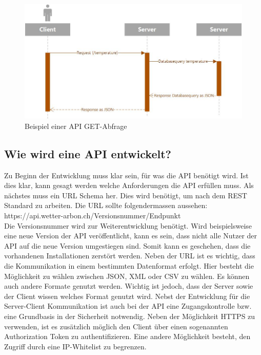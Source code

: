 \begin{figure}[h!]
	\centering
	\includegraphics[width=1\linewidth]{img/Sequenzdiagramm_API}
	\caption{Beispiel einer API GET-Abfrage}
	\label{img:Sequenzdiagramm_API}
\end{figure}


\subsection{Wie wird eine API entwickelt?}
Zu Beginn der Entwicklung muss klar sein, für was die API benötigt wird. Ist dies klar, kann gesagt werden welche Anforderungen die API erfüllen muss. Als nächstes muss ein URL Schema her. Dies wird benötigt, um nach dem REST Standard zu arbeiten. Die URL sollte folgendermassen aussehen: \\ https://api.wetter-arbon.ch/Versionsnummer/Endpunkt\\
Die Versionsnummer wird zur Weiterentwicklung benötigt. Wird beispielsweise eine neue Version der API veröffentlicht, kann es sein, dass nicht alle Nutzer der API auf die neue Version umgestiegen sind. Somit kann es geschehen, dass die vorhandenen Installationen zerstört werden. Neben der URL ist es wichtig, dass die Kommunikation in einem bestimmten Datenformat erfolgt. Hier besteht die Möglichkeit zu wählen zwischen JSON, XML oder CSV zu wählen. Es können auch andere Formate genutzt werden. Wichtig ist jedoch, dass der Server sowie der Client wissen welches Format genutzt wird. Nebst der Entwicklung für die Server-Client Kommunikation ist auch bei der API eine Zugangskontrolle bzw. eine Grundbasis in der Sicherheit notwendig. Neben der Möglichkeit HTTPS zu verwenden, ist es zusätzlich möglich den Client über einen sogenannten Authorization Token zu authentifizieren. Eine andere Möglichkeit besteht, den Zugriff durch eine IP-Whitelist zu begrenzen. \\


